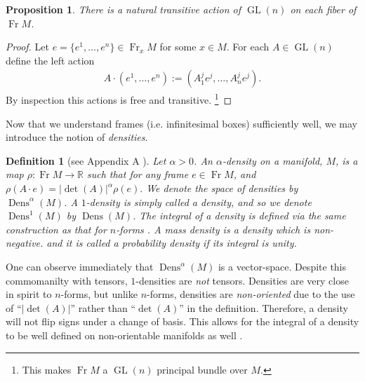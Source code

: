 \documentclass[letterpaper, 10 pt, conference]{ieeeconf}
\newcommand{\R}{\mathbb{R}}
\newtheorem{defn}[thm]{Definition}
\newtheorem{prop}[thm]{Proposition}
\DeclareMathOperator{\Fr}{Fr}
\DeclareMathOperator{\GL}{GL}
\DeclareMathOperator{\Dens}{Dens}
\begin{document}
  \begin{prop}
    There is a natural transitive
    action of $\GL(n)$ on each fiber of $\Fr M$.
  \end{prop}

  \begin{proof}
    Let $e = \{ e^1,\dots,e^n \} \in \Fr_x M$ for some $x \in M$.
    For each $A \in \GL(n)$ define the left action
    \begin{align*}
      A \cdot (e^1,\dots,e^n) := (A^j_1 e^j , \dots, A_n^j e^j ). 
    \end{align*}
    By inspection this actions is free and transitive.
    \footnote{This makes $\Fr M$ a $\GL(n)$ principal bundle over $M$.}
  \end{proof}

  Now that we understand frames (i.e. infinitesimal boxes)
  sufficiently well, we may introduce the notion of \emph{densities}.

  \begin{defn}[see Appendix A \cite{BatesWeinstein1997}]
    \label{eq:density}
    Let $\alpha > 0$.
    An $\alpha$-\emph{density} on a manifold, $M$, is a map
    $\rho:\Fr M \to \R$ such that
    for any frame $e \in \Fr M$, and
    $
      \rho( A \cdot e ) =  | \det(A) |^\alpha \rho(e).
    $
    We denote the space of densities by $\Dens^\alpha(M)$.
    A $1$-density is simply called a \emph{density}, and
    so we denote $\Dens^1(M)$ by $\Dens(M)$.
    The integral of a density is defined via the same construction as that
    for $n$-forms \cite[\S 14]{Lee2006}.
    A \emph{mass density} is a density which is non-negative.
    and it is called a \emph{probability density} if its integral is
    unity.
  \end{defn}

  One can observe immediately that $\Dens^\alpha(M)$ is a vector-space.
  Despite this commomanilty with tensors,
  $1$-densities are \emph{not} tensors.
  Densities are very close in spirit to $n$-forms,
  but unlike $n$-forms, densities are \emph{non-oriented}
  due to the use of ``$|\det(A)|$'' rather than ``$\det(A)$'' 
  in the definition.
  Therefore, a density will not flip signs under a change of basis.
  This allows for the integral of a density to be well defined
  on non-orientable manifolds as well \cite[Ch. 14]{Lee2006}.
\end{document}
